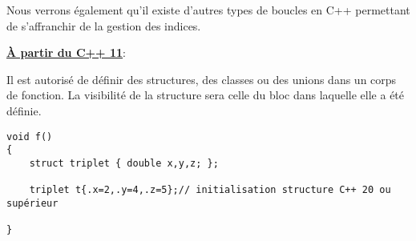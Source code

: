Nous verrons également qu'il existe d'autres types de boucles en C++ permettant de s'affranchir de la gestion des indices.

\underline{\textbf{À partir du C++ 11}}:

Il est autorisé de définir des structures, des classes ou des unions dans un corps de fonction. La visibilité de la structure sera celle du bloc dans laquelle elle a été définie.

\begin{lstlisting}[caption=déclaration d'une structure au sein d'une fonction (C++ 11 ou supérieur)]
void f()
{
    struct triplet { double x,y,z; };

    triplet t{.x=2,.y=4,.z=5};// initialisation structure C++ 20 ou supérieur

}
\end{lstlisting}
